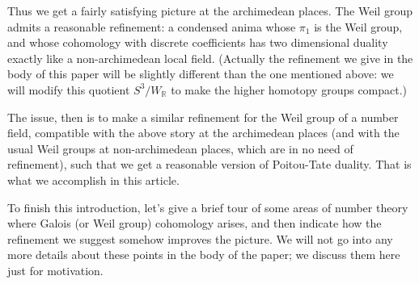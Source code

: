 \documentclass[12pt]{article}
\theoremstyle{definition}
\newcommand{\mbb}{\mathbb}
\begin{document}
Thus we get a fairly satisfying picture at the archimedean places.  The Weil group admits a reasonable refinement: a condensed anima whose $\pi_1$ is the Weil group, and whose cohomology with discrete coefficients has two dimensional duality exactly like a non-archimedean local field.  (Actually the refinement we give in the body of this paper will be slightly different than the one mentioned above: we will modify this quotient $S^3/W_\mbb{R}$ to make the higher homotopy groups compact.)

The issue, then is to make a similar refinement for the Weil group of a number field, compatible with the above story at the archimedean places (and with the usual Weil groups at non-archimedean places, which are in no need of refinement), such that we get a reasonable version of Poitou-Tate duality.  That is what we accomplish in this article.

To finish this introduction, let's give a brief tour of some areas of number theory where Galois (or Weil group) cohomology arises, and then indicate how the refinement we suggest somehow improves the picture.  We will not go into any more details about these points in the body of the paper; we discuss them here just for motivation.
\end{document}
